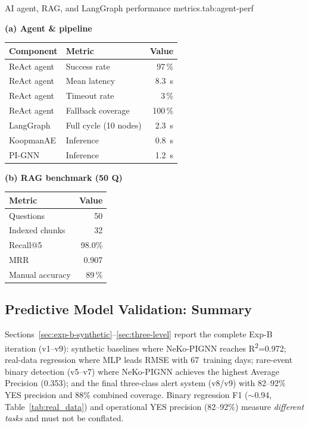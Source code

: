 \documentclass[preprint,12pt,times,numbers]{elsarticle}
\providecommand{\paneltitle}[1]{\par\noindent\textbf{#1}\par\smallskip}
\begin{document}
\begin{resulttable}{AI agent, RAG, and LangGraph performance metrics.}{tab:agent-perf}
\begin{minipage}[t]{0.48\linewidth}
\paneltitle{(a) Agent \& pipeline}
\begin{tabular}{@{}llr@{}}
\toprule
\textbf{Component} & \textbf{Metric} & \textbf{Value} \\
\midrule
ReAct agent & Success rate & 97\,\% \\
ReAct agent & Mean latency & 8.3~s \\
ReAct agent & Timeout rate & 3\,\% \\
ReAct agent & Fallback coverage & 100\,\% \\
LangGraph & Full cycle (10 nodes) & 2.3~s \\
KoopmanAE & Inference & 0.8~s \\
PI-GNN & Inference & 1.2~s \\
\bottomrule
\end{tabular}
\end{minipage}\hfill
\begin{minipage}[t]{0.48\linewidth}
\paneltitle{(b) RAG benchmark (50 Q)}
\begin{tabular}{@{}lr@{}}
\toprule
\textbf{Metric} & \textbf{Value} \\
\midrule
Questions & 50 \\
Indexed chunks & 32 \\
Recall@5 & 98.0\% \\
MRR & 0.907 \\
Manual accuracy & 89\,\% \\
\bottomrule
\end{tabular}
\end{minipage}
\end{resulttable}



\subsection{Predictive Model Validation: Summary}
\label{sec:model_validation}

Sections~\ref{sec:exp-b-synthetic}--\ref{sec:three-level} report the complete Exp-B iteration (v1--v9): synthetic baselines where NeKo-PIGNN reaches R\textsuperscript{2}=0.972; real-data regression where MLP leads RMSE with 67~training days; rare-event binary detection (v5--v7) where NeKo-PIGNN achieves the highest Average Precision (0.353); and the final three-class alert system (v8/v9) with 82--92\% YES precision and 88\% combined coverage. Binary regression F1 ($\sim$0.94, Table~\ref{tab:real_data}) and operational YES precision (82--92\%) measure \emph{different tasks} and must not be conflated.
\end{document}

